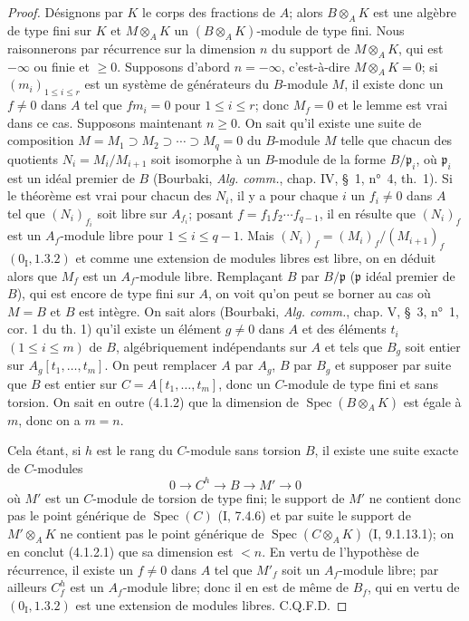 \begin{proof}
Désignons par $K$ le corps des fractions de $A$; alors $B\otimes_AK$ est une
algèbre de type fini sur $K$ et $M\otimes_AK$ un $(B\otimes_AK)$-module de
type fini. Nous raisonnerons par récurrence sur la dimension $n$ du support de
$M\otimes_AK$, qui est $-\infty$ ou finie et $\geq0$. Supposons d'abord
$n=-\infty$, c'est-à-dire $M\otimes_AK=0$; si $(m_i)_{1\leq i\leq r}$ est
un système de générateurs du $B$-module $M$, il existe donc un $f\ne0$ dans
$A$ tel que $fm_i=0$ pour $1\leq i\leq r$; donc $M_f=0$ et le lemme est vrai
dans ce cas. Supposons maintenant $n\geq0$. On sait qu'il existe une suite de
composition $M=M_1\supset M_2\supset\cdots\supset M_q=0$ du $B$-module $M$
telle que chacun des quotients $N_i=M_i/M_{i+1}$ soit isomorphe à un
$B$-module de la forme $B/\mathfrak p_i$, où $\mathfrak p_i$ est un idéal
premier de $B$ (Bourbaki, \emph{Alg. comm.}, chap. IV, \S~1, n°~4, th.~1).
Si le théorème est vrai pour chacun des $N_i$, il y a pour chaque $i$ un
$f_i\ne0$ dans $A$ tel que $(N_i)_{f_i}$ soit libre sur $A_{f_i}$; posant
$f=f_1f_2\cdots f_{q-1}$, il en résulte que $(N_i)_f$ est un $A_f$-module
libre pour $1\leq i\leq q-1$. Mais $(N_i)_f=(M_i)_f/(M_{i+1})_f$
$(0_{\mathrm I},1.3.2)$ et comme une extension de modules libres est libre, on
en déduit alors que $M_f$ est un $A_f$-module libre. Remplaçant $B$ par
$B/\mathfrak p$ ($\mathfrak p$ idéal premier de $B$), qui est encore de type
fini sur $A$, on voit qu'on peut se borner au cas où $M=B$ et $B$ est intègre.
On sait alors (Bourbaki, \emph{Alg. comm.}, chap. V, \S~3, n°~1, cor. 1 du
th. 1) qu'il existe un élément $g\ne0$ dans $A$ et des éléments $t_i$
$(1\leq i\leq m)$ de $B$, algébriquement indépendants sur $A$ et tels que
$B_g$ soit entier sur $A_g[t_1,\ldots,t_m]$. On peut remplacer $A$ par $A_g$,
$B$ par $B_g$ et supposer par suite que $B$ est entier sur
$C=A[t_1,\ldots,t_m]$, donc un $C$-module de type fini et sans torsion. On sait
en outre (4.1.2) que la dimension de $\operatorname{Spec}(B\otimes_AK)$ est
égale à $m$, donc on a $m=n$.

Cela étant, si $h$ est le rang du $C$-module sans torsion $B$, il existe une
suite exacte de $C$-modules
\[
0\longrightarrow C^h\longrightarrow B\longrightarrow M'\longrightarrow0
\]
où $M'$ est un $C$-module de torsion de type fini; le support de $M'$ ne
contient donc pas le point générique de $\operatorname{Spec}(C)$ (I, 7.4.6)
et par suite le support de $M'\otimes_AK$ ne contient pas le point générique
de $\operatorname{Spec}(C\otimes_AK)$ (I, 9.1.13.1); on en conclut (4.1.2.1)
que sa dimension est $<n$. En vertu de l'hypothèse de récurrence, il existe un
$f\ne0$ dans $A$ tel que $M'_f$ soit un $A_f$-module libre; par ailleurs
$C_f^h$ est un $A_f$-module libre; donc il en est de même de $B_f$, qui en
vertu de $(0_{\mathrm I},1.3.2)$ est une extension de modules libres. C.Q.F.D.
\end{proof}

